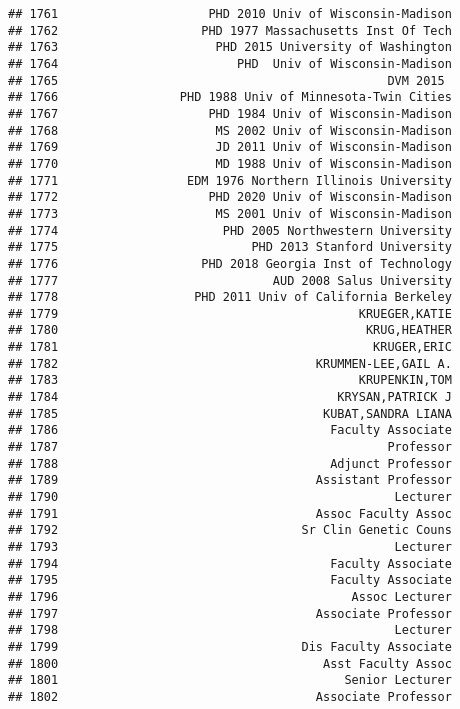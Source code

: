 \documentclass[
]{article}
\begin{document}
\begin{verbatim}
## 1761                     PHD 2010 Univ of Wisconsin-Madison
## 1762                    PHD 1977 Massachusetts Inst Of Tech
## 1763                      PHD 2015 University of Washington
## 1764                         PHD  Univ of Wisconsin-Madison
## 1765                                              DVM 2015 
## 1766                 PHD 1988 Univ of Minnesota-Twin Cities
## 1767                     PHD 1984 Univ of Wisconsin-Madison
## 1768                      MS 2002 Univ of Wisconsin-Madison
## 1769                      JD 2011 Univ of Wisconsin-Madison
## 1770                      MD 1988 Univ of Wisconsin-Madison
## 1771                  EDM 1976 Northern Illinois University
## 1772                     PHD 2020 Univ of Wisconsin-Madison
## 1773                      MS 2001 Univ of Wisconsin-Madison
## 1774                       PHD 2005 Northwestern University
## 1775                           PHD 2013 Stanford University
## 1776                    PHD 2018 Georgia Inst of Technology
## 1777                              AUD 2008 Salus University
## 1778                   PHD 2011 Univ of California Berkeley
## 1779                                          KRUEGER,KATIE
## 1780                                           KRUG,HEATHER
## 1781                                            KRUGER,ERIC
## 1782                                    KRUMMEN-LEE,GAIL A.
## 1783                                          KRUPENKIN,TOM
## 1784                                       KRYSAN,PATRICK J
## 1785                                     KUBAT,SANDRA LIANA
## 1786                                      Faculty Associate
## 1787                                              Professor
## 1788                                      Adjunct Professor
## 1789                                    Assistant Professor
## 1790                                               Lecturer
## 1791                                    Assoc Faculty Assoc
## 1792                                  Sr Clin Genetic Couns
## 1793                                               Lecturer
## 1794                                      Faculty Associate
## 1795                                      Faculty Associate
## 1796                                         Assoc Lecturer
## 1797                                    Associate Professor
## 1798                                               Lecturer
## 1799                                  Dis Faculty Associate
## 1800                                     Asst Faculty Assoc
## 1801                                        Senior Lecturer
## 1802                                    Associate Professor

\end{verbatim}
\end{document}
